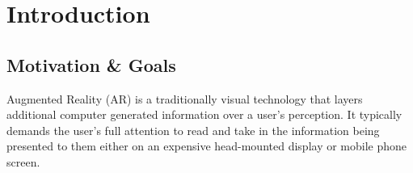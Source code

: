 \documentclass{l4proj}
\begin{document}
\tableofcontents

%
%
%

%
%
%
%
\chapter{Introduction}



\section{Motivation \& Goals}
Augmented Reality (AR) is a traditionally visual technology that layers additional computer generated information over a user's perception. It typically demands the user's full attention to read and take in the information being presented to them either on an expensive head-mounted display or mobile phone screen.
\end{document}
